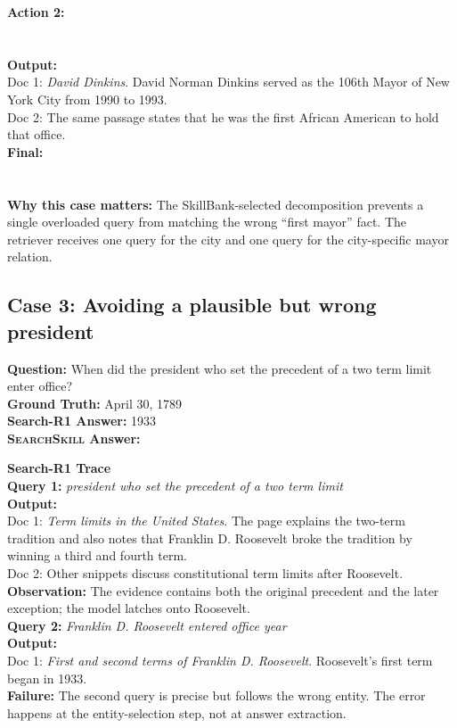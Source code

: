 \documentclass{article}
\newcommand{\Ours}{\textsc{SearchSkill}\xspace}
\begin{document}
\textbf{Action 2:}\\
\\
\\
\textbf{Output:}\\
Doc 1: \emph{David Dinkins}. David Norman Dinkins served as the 106th Mayor of New York City from 1990 to 1993.\\
Doc 2: The same passage states that he was the first African American to hold that office.\\
\textbf{Final:}\\
\\
\\
\textbf{Why this case matters:} The SkillBank-selected decomposition prevents a single overloaded query from matching the wrong ``first mayor'' fact. The retriever receives one query for the city and one query for the city-specific mayor relation.
\casehr

\subsection{Case 3: Avoiding a plausible but wrong president}
\casehr
\small
\noindent\textbf{Question:} When did the president who set the precedent of a two term limit enter office?\\
\textbf{Ground Truth:} April 30, 1789\\
\textbf{Search-R1 Answer:} 1933\\
\textbf{\Ours Answer:} 

\casedash
\noindent\textcolor{red!75!black}{\textbf{Search-R1 Trace}}\\
\textbf{Query 1:} \emph{president who set the precedent of a two term limit}\\
\textbf{Output:}\\
Doc 1: \emph{Term limits in the United States}. The page explains the two-term tradition and also notes that Franklin D. Roosevelt broke the tradition by winning a third and fourth term.\\
Doc 2: Other snippets discuss constitutional term limits after Roosevelt.\\
\textbf{Observation:} The evidence contains both the original precedent and the later exception; the model latches onto Roosevelt.\\
\textbf{Query 2:} \emph{Franklin D. Roosevelt entered office year}\\
\textbf{Output:}\\
Doc 1: \emph{First and second terms of Franklin D. Roosevelt}. Roosevelt's first term began in 1933.\\
\textbf{Failure:} The second query is precise but follows the wrong entity. The error happens at the entity-selection step, not at answer extraction.
\end{document}
